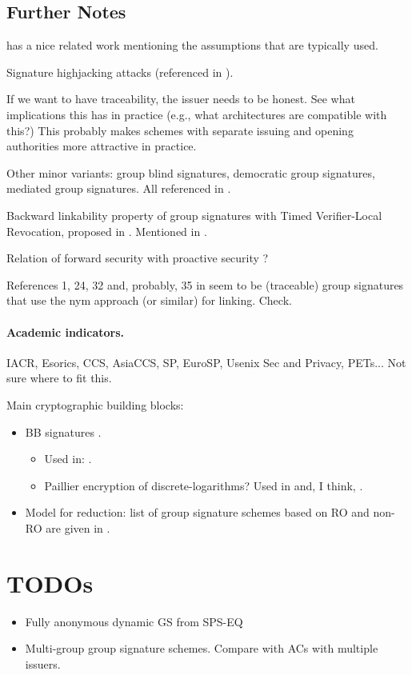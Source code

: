 \subsection{Further Notes}


\cite{ehk+19} has a nice related work mentioning the assumptions that are
typically used.

Signature highjacking attacks (referenced in \cite{ehk+19}).

If we want to have traceability, the issuer needs to be honest. See what
implications this has in practice (e.g., what architectures are compatible
with this?) This probably makes schemes with separate issuing and opening
authorities more attractive in practice.

Other minor variants: group blind signatures, democratic group signatures,
mediated group signatures. All referenced in \cite[Section 1.3.5]{bsi12}.

Backward linkability property of group signatures with Timed Verifier-Local
Revocation, proposed in \cite{nf05}. Mentioned in \cite[Section 8.1.2]{bsi12}.

Relation of forward security with proactive security \cite{oy91}?

References 1, 24, 32 and, probably, 35 in \cite{bfg+11} seem to be (traceable)
group signatures that use the nym approach (or similar) for linking. Check.

\paragraph{Academic indicators.}
IACR, Esorics, CCS, AsiaCCS, SP, EuroSP, Usenix Sec and Privacy, PETs... Not
sure where to fit this.

Main cryptographic building blocks:

\begin{itemize}
\item BB signatures \cite{bb04}.
  \begin{itemize}
  \item Used in: \cite{ky05}.
  \item Paillier encryption of discrete-logarithms? Used in \cite{ky05} and,
    I think, \cite{gl19}.    
  \end{itemize}
\item Model for reduction: list of group signature schemes based on RO and
  non-RO are given in \cite{bcc+16}.
\end{itemize}

\section{TODOs}

\begin{itemize}
\item Fully anonymous dynamic GS from SPS-EQ \cite{ds16}
\item Multi-group group signature schemes. Compare with ACs with multiple
  issuers.
\end{itemize}

